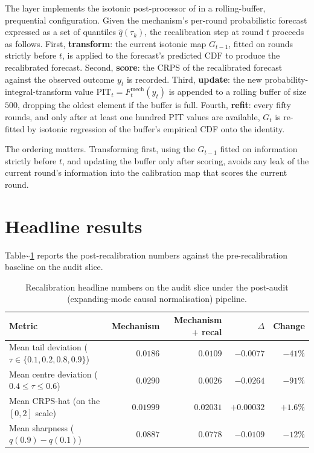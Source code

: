 \documentclass[
  11pt,
  a4paper,
  oneside]{report}
\begin{document}
The layer implements the isotonic post-processor of
\citet{kuleshov2018accurate} in a rolling-buffer, prequential
\citep{dawid1984prequential} configuration. Given the mechanism's
per-round probabilistic forecast expressed as a set of quantiles
\(\hat q(\tau_k)\), the recalibration step at round \(t\) proceeds as
follows. First, \textbf{transform}: the current isotonic map
\(G_{t-1}\), fitted on rounds strictly before \(t\), is applied to the
forecast's predicted CDF to produce the recalibrated forecast. Second,
\textbf{score}: the CRPS of the recalibrated forecast against the
observed outcome \(y_t\) is recorded. Third, \textbf{update}: the new
probability-integral-transform value
\(\mathrm{PIT}_t = F_t^{\text{mech}}(y_t)\) is appended to a rolling
buffer of size \(500\), dropping the oldest element if the buffer is
full. Fourth, \textbf{refit}: every fifty rounds, and only after at
least one hundred PIT values are available, \(G_t\) is re-fitted by
isotonic regression of the buffer's empirical CDF onto the identity.

The ordering matters. Transforming first, using the \(G_{t-1}\) fitted
on information strictly before \(t\), and updating the buffer only after
scoring, avoids any leak of the current round's information into the
calibration map that scores the current round.

\section{Headline results}\label{headline-results}

Table\textasciitilde{}\ref{tab:recal-headline} reports the
post-recalibration numbers against the pre-recalibration baseline on the
audit slice.

\begin{table}[h]
\centering
\small
\begin{tabular}{lrrrr}
\toprule
Metric & Mechanism & Mechanism $+$ recal & $\Delta$ & Change \\
\midrule
Mean tail deviation ($\tau \in \{0.1, 0.2, 0.8, 0.9\}$)
  & $0.0186$ & $0.0109$ & $-0.0077$ & $-41\%$ \\
Mean centre deviation ($0.4 \leq \tau \leq 0.6$)
  & $0.0290$ & $0.0026$ & $-0.0264$ & $-91\%$ \\
Mean CRPS-hat (on the $[0, 2]$ scale)
  & $0.01999$ & $0.02031$ & $+0.00032$ & $+1.6\%$ \\
Mean sharpness ($q(0.9) - q(0.1)$)
  & $0.0887$ & $0.0778$ & $-0.0109$ & $-12\%$ \\
\bottomrule
\end{tabular}
\caption{Recalibration headline numbers on the audit slice under the
post-audit (expanding-mode causal normalisation) pipeline.}
\label{tab:recal-headline}
\end{table}
\end{document}
